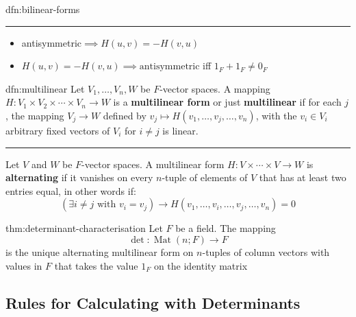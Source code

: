 \documentclass[landscape, 8pt]{extarticle}
\DeclareMathOperator{\Mat}{Mat}
\begin{document}
\begin{multicols}{3}
\begin{dfn}{dfn:bilinear-forms}{}
    \noindent\rule{\textwidth}{0.2pt}
    \begin{itemize}
        \item antisymmetric$\implies H(u, v) = -H(v, u)$
        \item $H(u, v) = -H(v, u) \implies \text{antisymmetric}$ iff $1_{F} + 1_{F} \ne 0_{F}$
    \end{itemize}
\end{dfn}

\begin{dfn}{dfn:multilinear}{}
    Let $V_{1},\dots,V_{n}, W$ be $F$-vector spaces. A mapping $H : V_{1} \times V_{2} \times \cdots \times V_{n} \to W$ is a \textbf{multilinear form} or just \textbf{multilinear} if for each $j$, the mapping $V_{j}\to W$ defined by $v_{j}\mapsto H(v_{1},\dots,v_{j},\dots,v_{n})$, with the $v_{i}\in V_{i}$ arbitrary fixed vectors of $V_{i}$ for $i\ne j$ is linear. 

    \noindent\rule{\textwidth}{0.2pt}
    Let $V$ and $W$ be $F$-vector spaces. A multilinear form $ H : V \times \cdots \times V \to W$ is \textbf{alternating} if it vanishes on every $n$-tuple of elements of $V$ that has at least two entries equal, in other words if:
    \[(\exists i\ne j \text{ with } v_{i} = v_{j})\to H(v_{1},\dots,v_{i},\dots,v_{j},\dots,v_{n}) = 0\]
\end{dfn}

\begin{thm}{thm:determinant-characterisation}{}
    Let $F$ be a field. The mapping
    \[\det : \Mat(n;F) \to F\]
    is the unique alternating multilinear form on $n$-tuples of column vectors with values in $F$ that takes the value $1_{F}$ on the identity matrix
\end{thm}



\subsection{Rules for Calculating with Determinants}


\end{multicols}
\end{document}
